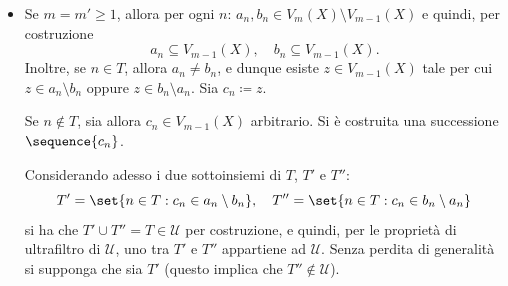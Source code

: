{\begin{itemize}
\begin{equation*}
        \end{equation*}dunque, se per assurdo $ \hslash\left(\sequence{b_{n} }_{\mathcal{U}}\right) = \hslash\left(\sequence{a_{n} }_{\mathcal{U}}\right) \subseteq V(\nonstandard{X}) $ si avrebbe che l'intesezione conterrebbe $ \hslash\left(\sequence{a_{n} }_{\mathcal{U}}\right) \neq \emptyset $.
        \item Se $ m=m'\ge 1 $, allora per ogni $ n $: $ a_{n}, b_{n}  \in V_{m}(X)\setminus V_{m-1}(X)$ e quindi, per costruzione \begin{equation*}
            a_{n} \subseteq V_{m-1}(X),\quad b_{n} \subseteq V_{m-1}(X).    
        \end{equation*}Inoltre, se $ n \in T $, allora $ a_{n}\neq b_{n}   $, e dunque esiste $ z \in V_{m-1}(X) $ tale per cui $ z \in a_{n}\setminus b_{n} $ oppure $ z \in b_{n}\setminus a_{n}$. Sia $ c_{n}\coloneqq z $. 

        Se $ n \notin T $, sia allora $ c_{n} \in V_{m-1}(X)$ arbitrario. Si è costruita una successione $ \sequence{c_{n} }  $. 

        Considerando adesso i due sottoinsiemi di $ T $, $ T' $ e $ T'' $: \begin{equation*}
            T' = \set{n \in T: c_{n} \in a_{n}\setminus b_{n}   }, \quad T'' = \set{n \in T: c_{n} \in b_{n}\setminus a_{n}}
        \end{equation*}si ha che $ T'\cup T'' = T \in \mathcal{U}$ per costruzione, e quindi, per le proprietà di ultrafiltro di $ \mathcal{U} $, uno tra $ T' $ e $ T'' $ appartiene ad $ \mathcal{U} $. Senza perdita di generalità si supponga che sia $ T' $ (questo implica che $ T'' \notin \mathcal{U}$). 


\end{itemize}}
